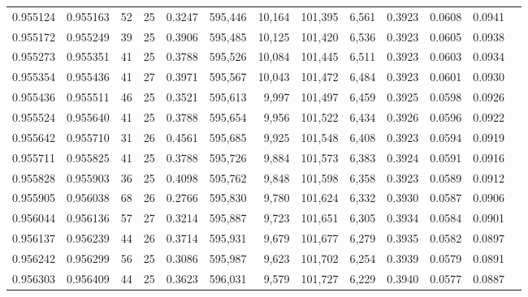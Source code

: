 \begin{tabular}{rrrrrrrrrrrrr}
0.955124 & 0.955163 &    52 &  25 &                                     0.3247 & 595,446 &  10,164 & 101,395 &   6,561 & 0.3923 & 0.0608 & 0.0941 \\
0.955172 & 0.955249 &    39 &  25 &                                     0.3906 & 595,485 &  10,125 & 101,420 &   6,536 & 0.3923 & 0.0605 & 0.0938 \\
0.955273 & 0.955351 &    41 &  25 &                                     0.3788 & 595,526 &  10,084 & 101,445 &   6,511 & 0.3923 & 0.0603 & 0.0934 \\
0.955354 & 0.955436 &    41 &  27 &                                     0.3971 & 595,567 &  10,043 & 101,472 &   6,484 & 0.3923 & 0.0601 & 0.0930 \\
0.955436 & 0.955511 &    46 &  25 &                                     0.3521 & 595,613 &   9,997 & 101,497 &   6,459 & 0.3925 & 0.0598 & 0.0926 \\
0.955524 & 0.955640 &    41 &  25 &                                     0.3788 & 595,654 &   9,956 & 101,522 &   6,434 & 0.3926 & 0.0596 & 0.0922 \\
0.955642 & 0.955710 &    31 &  26 &                                     0.4561 & 595,685 &   9,925 & 101,548 &   6,408 & 0.3923 & 0.0594 & 0.0919 \\
0.955711 & 0.955825 &    41 &  25 &                                     0.3788 & 595,726 &   9,884 & 101,573 &   6,383 & 0.3924 & 0.0591 & 0.0916 \\
0.955828 & 0.955903 &    36 &  25 &                                     0.4098 & 595,762 &   9,848 & 101,598 &   6,358 & 0.3923 & 0.0589 & 0.0912 \\
0.955905 & 0.956038 &    68 &  26 &                                     0.2766 & 595,830 &   9,780 & 101,624 &   6,332 & 0.3930 & 0.0587 & 0.0906 \\
0.956044 & 0.956136 &    57 &  27 &                                     0.3214 & 595,887 &   9,723 & 101,651 &   6,305 & 0.3934 & 0.0584 & 0.0901 \\
0.956137 & 0.956239 &    44 &  26 &                                     0.3714 & 595,931 &   9,679 & 101,677 &   6,279 & 0.3935 & 0.0582 & 0.0897 \\
0.956242 & 0.956299 &    56 &  25 &                                     0.3086 & 595,987 &   9,623 & 101,702 &   6,254 & 0.3939 & 0.0579 & 0.0891 \\
0.956303 & 0.956409 &    44 &  25 &                                     0.3623 & 596,031 &   9,579 & 101,727 &   6,229 & 0.3940 & 0.0577 & 0.0887 \\

\end{tabular}
